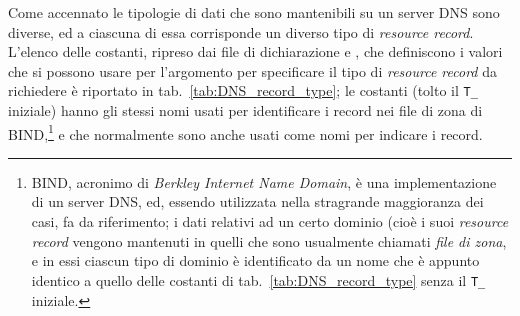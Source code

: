 Come accennato le tipologie di dati che sono mantenibili su un server DNS sono
diverse, ed a ciascuna di essa corrisponde un diverso tipo di \textit{resource
  record}. L'elenco delle costanti, ripreso dai file di dichiarazione
 e , che
definiscono i valori che si possono usare per l'argomento  per
specificare il tipo di \textit{resource record} da richiedere è riportato in
tab.~\ref{tab:DNS_record_type}; le costanti (tolto il \texttt{T\_} iniziale)
hanno gli stessi nomi usati per identificare i record nei file di zona di
BIND,\footnote{BIND, acronimo di \textit{Berkley Internet Name Domain}, è una
  implementazione di un server DNS, ed, essendo utilizzata nella stragrande
  maggioranza dei casi, fa da riferimento; i dati relativi ad un certo dominio
  (cioè i suoi \textit{resource record} vengono mantenuti in quelli che sono
  usualmente chiamati \textsl{file di zona}, e in essi ciascun tipo di dominio
  è identificato da un nome che è appunto identico a quello delle costanti di
  tab.~\ref{tab:DNS_record_type} senza il \texttt{T\_} iniziale.} e che
normalmente sono anche usati come nomi per indicare i record.

